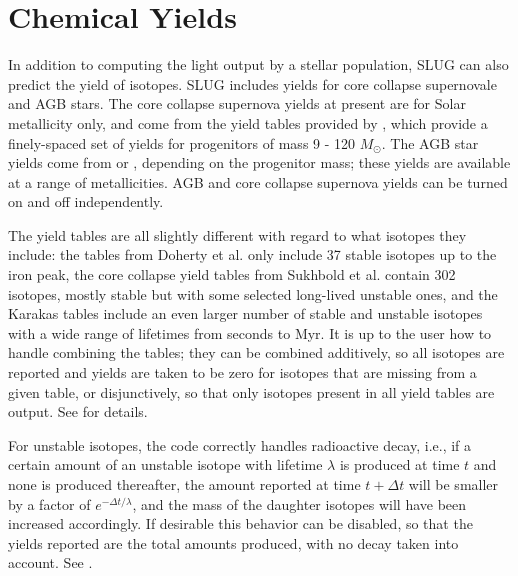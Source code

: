 \documentclass[letterpaper,10pt,english]{sphinxmanual}
\begin{document}
\section{Chemical Yields}
\label{\detokenize{intro:chemical-yields}}\label{\detokenize{intro:ssec-yields}}
In addition to computing the light output by a stellar population,
SLUG can also predict the yield of isotopes. SLUG includes yields for
core collapse supernovale and AGB stars. The core collapse supernova
yields at present are for Solar metallicity only, and come from the
yield tables provided by , which provide a
finely-spaced set of yields for progenitors of mass 9 - 120
\(M_\odot\). The AGB star yields come from  or
, depending
on the progenitor mass; these yields are available at a range of
metallicities. AGB and core collapse supernova yields can be
turned on and off independently.

The yield tables are all slightly different with regard to what
isotopes they include: the tables from Doherty et al. only include 37
stable isotopes up to the iron peak, the core collapse yield tables
from Sukhbold et al. contain 302 isotopes, mostly stable but with some
selected long-lived unstable ones, and the Karakas tables include an
even larger number of stable and unstable isotopes with a wide range
of lifetimes from seconds to Myr. It is up to the user how to handle
combining the tables; they can be combined additively, so all isotopes
are reported and yields are taken to be zero for isotopes that are
missing from a given table, or disjunctively, so that only isotopes
present in all yield tables are output. See {\hyperref[\detokenize{parameters:sec-parameters}]{}} for
details.

For unstable isotopes, the code correctly handles radioactive decay,
i.e., if a certain amount of an unstable isotope with lifetime
\(\lambda\) is produced at time \(t\) and none is produced
thereafter, the amount reported at time \(t+\Delta t\) will be
smaller by a factor of \(e^{-\Delta t/\lambda}\), and the mass of
the daughter isotopes will have been increased accordingly. If
desirable this behavior can be disabled, so that the yields
reported are the total amounts produced, with no decay taken
into account. See {\hyperref[\detokenize{parameters:sec-parameters}]{}}.
\end{document}
